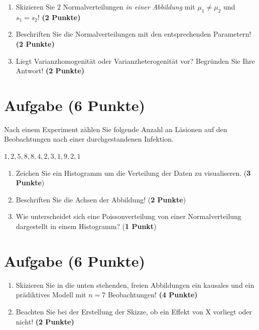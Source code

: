 \documentclass[a4paper, 10pt]{scrartcl}\usepackage[]{graphicx}\usepackage[]{xcolor}
\begin{document}
\begin{enumerate}
\item Skizieren Sie $2$ Normalverteilungen \textit{in einer
    Abbildung} mit $\mu_1 \neq \mu_2$ und $s_1 = s_2$! \textbf{(2 Punkte)}
\item Beschriften Sie die Normalverteilungen mit den entsprechenden
  Parametern! \textbf{(2 Punkte)}
\item Liegt Varianzhomogenit{\"a}t oder Varianzheterogenit{\"a}t vor? Begr{\"u}nden Sie
  Ihre Antwort! \textbf{(2 Punkte)}
\end{enumerate}

 
\clearpage

\section{Aufgabe \hfill (6 Punkte)}



Nach einem Experiment zählen Sie folgende Anzahl an Läsionen auf den Beobachtungen nach einer durchgestandenen Infektion. 

\begin{center}
$1, 2, 5, 8, 8, 4, 2, 3, 1, 9, 2, 1$
\end{center}

\begin{enumerate}
\item Zeichen Sie ein Histogramm um die Verteilung der Daten zu visualiseren. (\textbf{3 Punkte})
\item Beschriften Sie die Achsen der Abbildung! (\textbf{2 Punkte})
\item Wie unterscheidet sich eine Poissonverteilung von einer Normalverteilung dargestellt in einem Histogramm? (\textbf{1 Punkt})
\end{enumerate}

 
\clearpage

\section{Aufgabe \hfill (6 Punkte)}



\begin{enumerate}
\item Skizieren Sie in die unten stehenden, freien Abbildungen ein kausales
  und ein pr{\"a}diktives Modell mit $n = 7$
  Beobachtungen! \textbf{(4 Punkte)}
\item Beachten Sie bei der Erstellung der Skizze, ob ein Effekt von X
  vorliegt oder nicht! \textbf{(2 Punkte)}
\end{enumerate}
\end{document}
